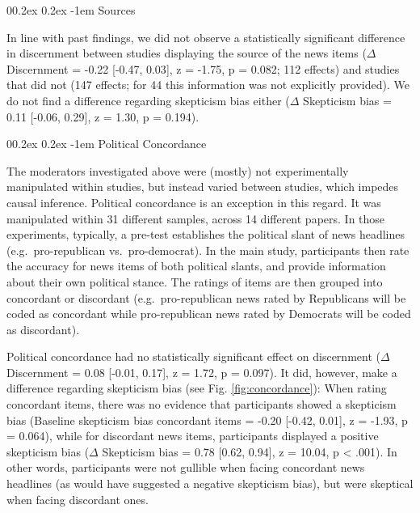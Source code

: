 \documentclass[
  doc,floatsintext]{apa6}
\makeatletter
\let\oldparagraph\paragraph
\renewcommand{\paragraph}{
    \@ifstar
      \xxxParagraphStar
      \xxxParagraphNoStar
  }
\newcommand{\xxxParagraphStar}[1]{\oldparagraph*{#1}\mbox{}}
\newcommand{\xxxParagraphNoStar}[1]{\oldparagraph{#1}\mbox{}}
\renewcommand{\paragraph}{\@startsection{paragraph}{4}{\parindent}%
  {0\baselineskip \@plus 0.2ex \@minus 0.2ex}%
  {-1em}%
  {\normalfont\normalsize\bfseries\itshape\typesectitle}}
\makeatother
\begin{document}
\paragraph{Sources}\label{sources}

In line with past findings, we did not observe a statistically significant difference in discernment between studies displaying the source of the news items (\(\Delta\) Discernment = -0.22 {[}-0.47, 0.03{]}, z = -1.75, p = 0.082; 112 effects) and studies that did not (147 effects; for 44 this information was not explicitly provided). We do not find a difference regarding skepticism bias either (\(\Delta\) Skepticism bias = 0.11 {[}-0.06, 0.29{]}, z = 1.30, p = 0.194).

\paragraph{Political Concordance}\label{political-concordance}

The moderators investigated above were (mostly) not experimentally manipulated within studies, but instead varied between studies, which impedes causal inference. Political concordance is an exception in this regard. It was manipulated within 31 different samples, across 14 different papers. In those experiments, typically, a pre-test establishes the political slant of news headlines (e.g.~pro-republican vs.~pro-democrat). In the main study, participants then rate the accuracy for news items of both political slants, and provide information about their own political stance. The ratings of items are then grouped into concordant or discordant (e.g.~pro-republican news rated by Republicans will be coded as concordant while pro-republican news rated by Democrats will be coded as discordant).

Political concordance had no statistically significant effect on discernment (\(\Delta\) Discernment = 0.08 {[}-0.01, 0.17{]}, z = 1.72, p = 0.097). It did, however, make a difference regarding skepticism bias (see Fig. \ref{fig:concordance}): When rating concordant items, there was no evidence that participants showed a skepticism bias (Baseline skepticism bias concordant items = -0.20 {[}-0.42, 0.01{]}, z = -1.93, p = 0.064), while for discordant news items, participants displayed a positive skepticism bias (\(\Delta\) Skepticism bias = 0.78 {[}0.62, 0.94{]}, z = 10.04, p \textless{} .001). In other words, participants were not gullible when facing concordant news headlines (as would have suggested a negative skepticism bias), but were skeptical when facing discordant ones.
\end{document}
